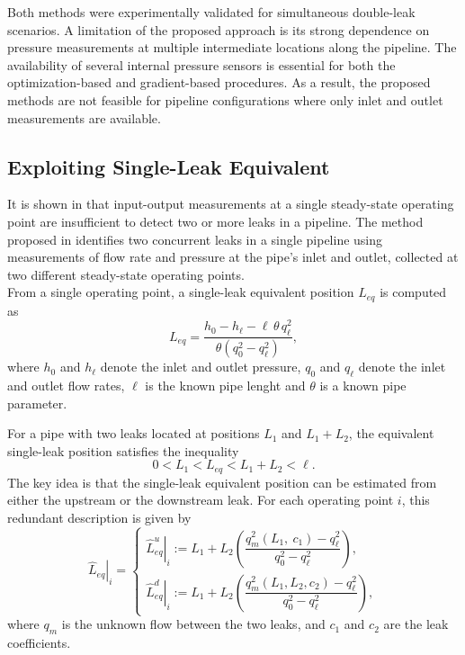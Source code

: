 Both methods were experimentally validated for simultaneous double-leak scenarios. A limitation of the proposed approach is its strong dependence on pressure measurements at multiple intermediate locations along the pipeline. The availability of several internal pressure sensors is essential for both the optimization-based and gradient-based procedures. As a result, the proposed methods are not feasible for pipeline configurations where only inlet and outlet measurements are available.

\subsection{Exploiting Single-Leak Equivalent}
\label{sec:peralta_study}

It is shown in \cite{verde2003} that input-output measurements at a single steady-state operating point are insufficient to detect two or more leaks in a pipeline. The method proposed in \cite{peralta2023} identifies two concurrent leaks in a single pipeline using measurements of flow rate and pressure at the pipe's inlet and outlet, collected at two different steady-state operating points.\\

From a single operating point, a single-leak equivalent position $L_{eq}$ is computed as
\begin{equation*}
L_{eq} =
\frac{h_0 - h_\ell - \ell \, \theta \, q_\ell^2}
{\theta \left( q_0^2 - q_\ell^2 \right)},
\end{equation*}
where $h_0$ and $h_\ell$ denote the inlet and outlet pressure, $q_0$ and $q_\ell$ denote the inlet and outlet flow rates, $\ell$ is the known pipe lenght and $\theta$ is a known pipe parameter.

For a pipe with two leaks located at positions $L_1$ and $L_1 + L_2$, the equivalent single-leak position satisfies the inequality
\begin{equation}
\label{eq:lit_ineq}
0 < L_1 < L_{eq} < L_1 + L_2 < \ell.
\end{equation}
The key idea is that the single-leak equivalent position can be estimated from either the upstream or the downstream leak. For each operating point $i$, this redundant description is given by
\begin{equation}
\label{eq:lit_lf_estimate}
\left.\hat{L}_{eq}\right\vert_i =
\begin{cases}
\left.\hat{L}^u_{eq}\right\vert_i
:=
L_1 + L_2
\left(
\dfrac{q_m^2(L_1,\ c_1) - q_{\ell}^2}
{q_0^2 -  q_{\ell}^2}
\right), \\[6pt]
\left.\hat{L}^{d}_{eq}\right\vert_i
:=
L_1 + L_2
\left(
\dfrac{q_m^2(L_1,L_2,c_2) -  q_{\ell}^2}
{q_0^2 -  q_{\ell}^2}
\right),
\end{cases}
\end{equation}
where $q_m$ is the unknown flow between the two leaks, and $c_1$ and $c_2$ are the leak coefficients.\\

